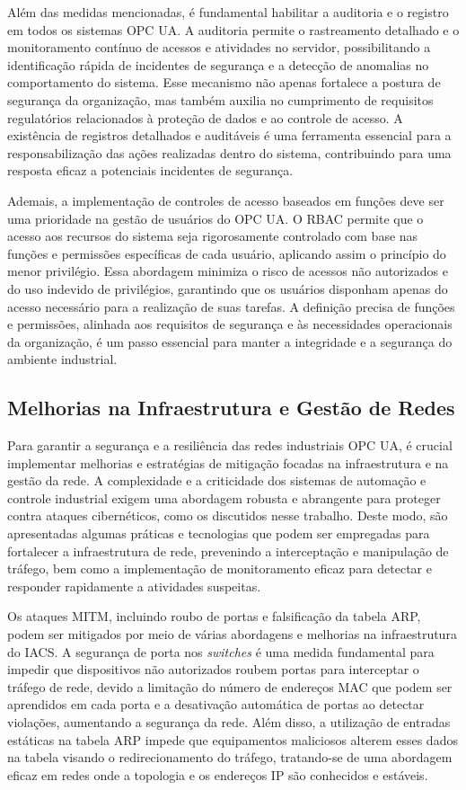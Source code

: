         Além das medidas mencionadas, é fundamental habilitar a auditoria e o registro em todos os sistemas OPC UA. A auditoria permite o rastreamento detalhado e o monitoramento contínuo de acessos e atividades no servidor, possibilitando a identificação rápida de incidentes de segurança e a detecção de anomalias no comportamento do sistema. Esse mecanismo não apenas fortalece a postura de segurança da organização, mas também auxilia no cumprimento de requisitos regulatórios relacionados à proteção de dados e ao controle de acesso. A existência de registros detalhados e auditáveis é uma ferramenta essencial para a responsabilização das ações realizadas dentro do sistema, contribuindo para uma resposta eficaz a potenciais incidentes de segurança.

        Ademais, a implementação de controles de acesso baseados em funções deve ser uma prioridade na gestão de usuários do OPC UA. O RBAC permite que o acesso aos recursos do sistema seja rigorosamente controlado com base nas funções e permissões específicas de cada usuário, aplicando assim o princípio do menor privilégio. Essa abordagem minimiza o risco de acessos não autorizados e do uso indevido de privilégios, garantindo que os usuários disponham apenas do acesso necessário para a realização de suas tarefas. A definição precisa de funções e permissões, alinhada aos requisitos de segurança e às necessidades operacionais da organização, é um passo essencial para manter a integridade e a segurança do ambiente industrial.

    \subsection{Melhorias na Infraestrutura e Gestão de Redes}

        Para garantir a segurança e a resiliência das redes industriais OPC UA, é crucial implementar melhorias e estratégias de mitigação focadas na infraestrutura e na gestão da rede. A complexidade e a criticidade dos sistemas de automação e controle industrial exigem uma abordagem robusta e abrangente para proteger contra ataques cibernéticos, como os discutidos nesse trabalho. Deste modo, são apresentadas algumas práticas e tecnologias que podem ser empregadas para fortalecer a infraestrutura de rede, prevenindo a interceptação e manipulação de tráfego, bem como a implementação de monitoramento eficaz para detectar e responder rapidamente a atividades suspeitas.

        Os ataques MITM, incluindo roubo de portas e falsificação da tabela ARP, podem ser mitigados por meio de várias abordagens e melhorias na infraestrutura do IACS. A segurança de porta nos \textit{switches} é uma medida fundamental para impedir que dispositivos não autorizados roubem portas para interceptar o tráfego de rede, devido a limitação do número de endereços MAC que podem ser aprendidos em cada porta e a desativação automática de portas ao detectar violações, aumentando a segurança da rede. Além disso, a utilização de entradas estáticas na tabela ARP impede que equipamentos maliciosos alterem esses dados na tabela visando o redirecionamento do tráfego, tratando-se de uma abordagem eficaz em redes onde a topologia e os endereços IP são conhecidos e estáveis. 
        
